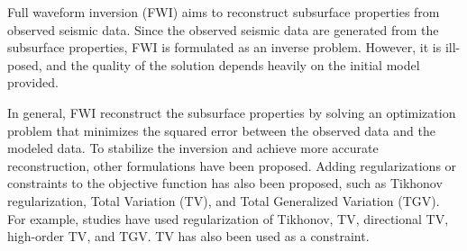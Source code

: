 %

Full waveform inversion (FWI)\cite{FWI0,FWI1} aims to reconstruct subsurface properties from observed seismic data.
Since the observed seismic data are generated from the subsurface properties, FWI is formulated as an inverse problem.
However, it is ill-posed, and the quality of the solution depends heavily on the initial model provided\cite{FWI1}.

In general, FWI reconstruct the subsurface properties by solving an optimization problem that minimizes the squared error between the observed data and the modeled data.
To stabilize the inversion and achieve more accurate reconstruction, other formulations have been proposed\cite{CustomFWI0,CustomFWI1,CustomFWI2,CustomFWI3,CustomFWI4,CustomFWI5}.
Adding regularizations or constraints to the objective function has also been proposed, such as Tikhonov regularization\cite{tikhonov}, Total Variation (TV)\cite{TV}, and Total Generalized Variation (TGV)\cite{TGV}.
For example, studies have used regularization of Tikhonov\cite{FWI-with-tikhonov-regularization}, TV\cite{FWI-with-TV-regularization}, directional TV\cite{FWI-with-directional-TV-regularization}, high-order TV\cite{FWI-with-high-order-TV-regularization}, and TGV\cite{FWI-with-TGV-regularization}.
TV has also been used as a constraint\cite{FWI-with-TV-constraint,FWI-with-TV-constraint2,FWI-with-TV-constraint3}.

